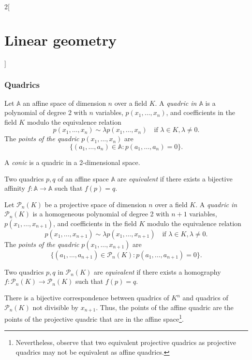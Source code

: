 \documentclass[../../../main.tex]{subfiles}
\begin{document}
\begin{multicols}{2}[\section{Linear geometry}]
    \subsubsection*{Quadrics}
    \begin{definition}
        Let $\mathbb{A}$ an affine space of dimension $n$ over a field $K$. A \textit{quadric in $\mathbb{A}$} is a polynomial of degree 2 with $n$ variables, $p(x_1,\ldots,x_n)$, and coefficients in the field $K$ modulo the equivalence relation $$p(x_1,\ldots,x_n)\sim\lambda p(x_1,\ldots,x_n)\quad\text{if }\lambda\in K,\lambda\ne0.$$ The \textit{points of the quadric} $p(x_1,\ldots,x_n)$ are $$\{(a_1,\ldots,a_n)\in\mathbb{A}:p(a_1,\ldots,a_n)=0\}.$$
    \end{definition}
    \begin{definition}
        A \textit{conic} is a quadric in a 2-dimensional space.
    \end{definition}
    \begin{definition}
        Two quadrics $p,q$ of an affine space $\mathbb{A}$ are \textit{equivalent} if there exists a bijective affinity $f:\mathbb{A}\rightarrow\mathbb{A}$ such that $f(p)=q$.
    \end{definition}
    \begin{definition}
        Let $\mathcal{P}_n(K)$ be a projective space of dimension $n$ over a field $K$. A \textit{quadric in $\mathcal{P}_n(K)$} is a homogeneous polynomial of degree 2 with $n+1$ variables, $p(x_1,\ldots,x_{n+1})$, and coefficients in the field $K$ modulo the equivalence relation $$p(x_1,\ldots,x_{n+1})\sim\lambda p(x_1,\ldots,x_{n+1})\quad\text{if }\lambda\in K,\lambda\ne0.$$ The \textit{points of the quadric} $p(x_1,\ldots,x_{n+1})$ are $$\{(a_1,\ldots,a_{n+1})\in\mathcal{P}_n(K):p(a_1,\ldots,a_{n+1})=0\}.$$
    \end{definition}
    \begin{definition}
        Two quadrics $p,q$ in $\mathcal{P}_n(K)$ are \textit{equivalent} if there exists a homography $f:\mathcal{P}_n(K)\rightarrow\mathcal{P}_n(K)$ such that $f(p)=q$.
    \end{definition}
    \begin{theorem}
        There is a bijective correspondence between quadrics of $K^n$ and quadrics of $\mathcal{P}_n(K)$ not divisible by $x_{n+1}$. Thus, the points of the affine quadric are the points of the projective quadric that are in the affine space\footnote{Nevertheless, observe that two equivalent projective quadrics as projective quadrics may not be equivalent as affine quadrics.}.

\end{theorem}
\end{multicols}
\end{document}

